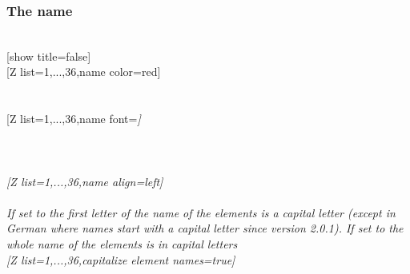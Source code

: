\vfill%
\subsubsection{\texorpdfstring{ The name}{The name}}\vspace{6pt}%
\\ [5pt][show title=false]%
\pgfPTstyle[show title=false]%
\\ [-1pt][Z list={1,...,36},name color=red]%
\\ [5pt]\makebox[\linewidth][c]{\scalebox{.6}{\pgfPT[Z list={1,...,36},name color=red]}}%
\\ [0pt]\pgfPTendoption%
\\ [5pt][Z list={1,...,36},name font=\string\itshape\string\tiny]%
\\ [5pt]\makebox[\linewidth][c]{\scalebox{.6}{\pgfPT[Z list={1,...,36},name font=\itshape\tiny]}}%
\\ [0pt]\pgfPTendoption%
\newpage\enlargethispage{\baselineskip}\ \\ [-32pt]%
\\ [5pt][Z list={1,...,36},name align=left]%
\\ [5pt]\makebox[\linewidth][c]{\scalebox{.6}{\pgfPT[Z list={1,...,36},name align=left]}}%
\\ [-5pt]\pgfPTendoption%
\label{option_capitalize element names}%
%
{If set to  the first letter of the name of the elements is a capital letter (except in German where names start with a capital letter since version 2.0.1). If set to  the whole name of the elements is in capital letters}%
\\ [5pt][Z list={1,...,36},capitalize element names=true]%
\\ [5pt]\makebox[\linewidth][c]{\scalebox{.6}{\pgfPT[Z list={1,...,36},capitalize element names=true]}}%
